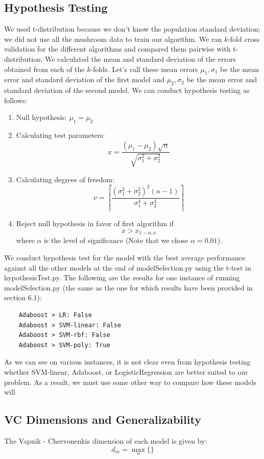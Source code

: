 \documentclass[fleqn]{article}
\begin{document}
    \subsection{Hypothesis Testing}
    We used t-distribution because we don’t know the population standard deviation; we did
    not use all the mushroom data to train our algorithm. We ran $k$-fold cross validation
    for the different algorithms and compared them pairwise with t-distribution. We
    calculated the mean and standard deviation of the errors obtained from each of the
    $k$-folds. Let's call these mean errors $ \mu_1, \sigma_1 $ be the mean error and standard
    deviation of the first model and $ \mu_2, \sigma_2 $ be the mean error and standard
    deviation of the second model. We can conduct hypothesis testing as follows:
    \begin{enumerate}
        \item Null hypothesis: $ \mu_1= \mu_2 $
        \item Calculating test parameters:
            $$ x = \frac{(\mu_1-\mu_2)\sqrt{n}}{\sqrt{\sigma_1^2 + \sigma_2^2}} $$
        \item Calculating degrees of freedom:
            $$ \nu = \left\lceil \frac{(\sigma_1^2 + \sigma_2^2)^2 (n-1)}{\sigma_1^4 + \sigma_2^4} \right\rceil $$
        \item Reject null hypothesis in favor of first algorithm if
            $$ x > x_{1-\alpha, \nu} $$
            where $ \alpha $ is the level of significance (Note that we chose $ \alpha = 0.01 $).
    \end{enumerate}
    We conduct hypothesis test for the model with the best average performance against all
    the other models at the end of modelSelection.py using the t-test in hypothesisTest.py.
    The following are the results for one instance of running modelSelection.py (the same
    as the one for which results have been provided in section 6.1):
    \begin{lstlisting}
    Adaboost > LR: False
    Adaboost > SVM-linear: False
    Adaboost > SVM-rbf: False
    Adaboost > SVM-poly: True
    \end{lstlisting}
    As we can see on various instances, it is not clear even from hypothesis testing whether
    SVM-linear, Adaboost, or LogisticRegression are better suited to our problem. As a result,
    we must use some other way to compare how these models will

    \subsection{VC Dimensions and Generalizability}
    The Vapnik - Chervonenkis dimension of each model is given by:
        $$ d_{vc} = \max_n\{\} $$
\end{document}
